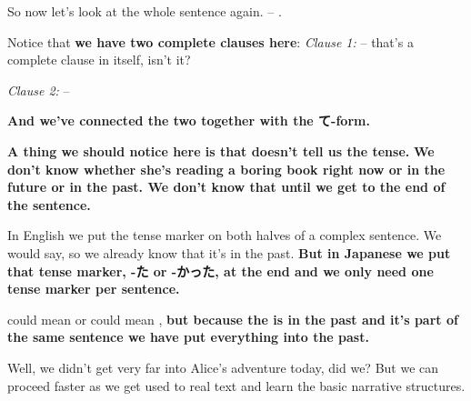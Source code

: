 So now let's look at the whole sentence again.  -- .

{}

Notice that {\bf we have two complete clauses here}: {\em Clause 1:}  -- that's a complete clause in itself, isn't it?

{\em Clause 2:}  -- 

{\bf And we've connected the two together with the て-form.}

\thinrule

{\bf A thing we should notice here is that  doesn't tell us the tense.} {\bf We don't know whether she's reading a boring book right now or in the future or in the past. We don't know that until we get to the end of the sentence.}

{}

In English we put the tense marker on both halves of a complex sentence. We would say,  so we already know that it's in the past. {\bf But in Japanese we put that tense marker, -た or -かった, at the end and we only need one tense marker per sentence.}

{}

 could mean  or could mean , {\bf but because the  is in the past and it's part of the same sentence we have put everything into the past.}

Well, we didn't get very far into Alice's adventure today, did we? But we can proceed faster as we get used to real text and learn the basic narrative structures.

\stopsectionlevel
